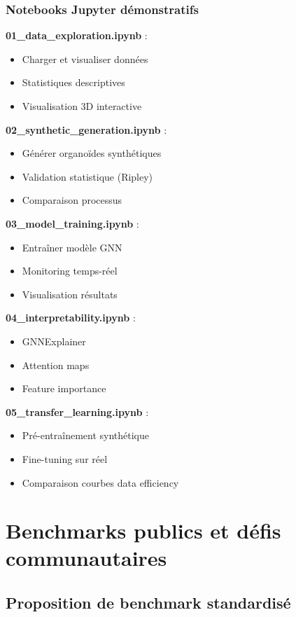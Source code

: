 \subsubsection{Notebooks Jupyter démonstratifs}

\textbf{01\_data\_exploration.ipynb} :
\begin{itemize}
    \item Charger et visualiser données
    \item Statistiques descriptives
    \item Visualisation 3D interactive
\end{itemize}

\textbf{02\_synthetic\_generation.ipynb} :
\begin{itemize}
    \item Générer organoïdes synthétiques
    \item Validation statistique (Ripley)
    \item Comparaison processus
\end{itemize}

\textbf{03\_model\_training.ipynb} :
\begin{itemize}
    \item Entraîner modèle GNN
    \item Monitoring temps-réel
    \item Visualisation résultats
\end{itemize}

\textbf{04\_interpretability.ipynb} :
\begin{itemize}
    \item GNNExplainer
    \item Attention maps
    \item Feature importance
\end{itemize}

\textbf{05\_transfer\_learning.ipynb} :
\begin{itemize}
    \item Pré-entraînement synthétique
    \item Fine-tuning sur réel
    \item Comparaison courbes data efficiency
\end{itemize}

\section{Benchmarks publics et défis communautaires}

\subsection{Proposition de benchmark standardisé}

